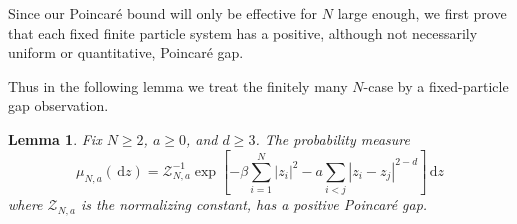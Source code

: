 \documentclass[12pt,reqno,letterpaper]{amsart}
\newtheorem{lemma}[theorem]{Lemma}
\theoremstyle{definition}
\theoremstyle{remark}
\numberwithin{equation}{section}
\newcommand{\dd}{\,\mathrm d}
\newcommand{\be}{\beta}
\begin{document}
Since our Poincar\'e bound will only be effective for $N$ large enough, we first prove that each fixed finite particle system has a positive, although not necessarily uniform or quantitative, Poincar\'e gap.  

Thus in the following lemma we treat the finitely many $N$-case by a fixed-particle gap observation.
\begin{lemma}
\label{lem:fixed-N-gap}
Fix \(N\ge2\), \(a\ge0\), and \(d\ge3\).  The probability measure
\begin{equation*}
 \mu_{N,a}(\dd z)=\mathcal Z_{N,a}^{-1}
 \exp\left[-\be\sum_{i=1}^N|z_i|^2
 -a\sum_{i<j}|z_i-z_j|^{2-d}\right]\dd z
\end{equation*}
where \(\mathcal Z_{N,a}\) is the normalizing constant, has a positive
Poincar\'e gap.
\end{lemma}
\end{document}
